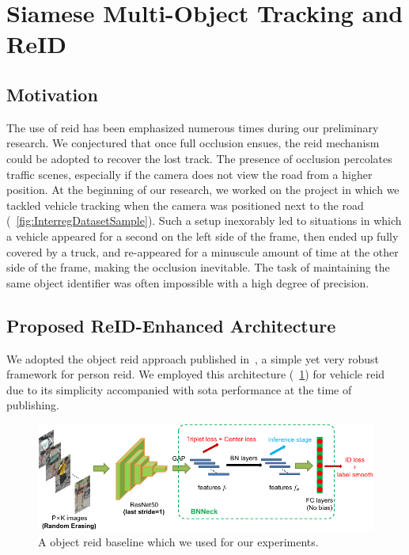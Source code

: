 \section{Siamese Multi-Object Tracking and ReID}
\label{sec:SiamMOTandReID}

\subsection{Motivation}

The use of \gls{reid} has been emphasized numerous times during our preliminary research. We conjectured that once full occlusion ensues, the \gls{reid} mechanism could be adopted to recover the lost track. The presence of occlusion percolates traffic scenes, especially if the camera does not view the road from a higher position. At the beginning of our research, we worked on the \interreg{} project in which we tackled vehicle tracking when the camera was positioned next to the road (\figtext{}~\ref{fig:InterregDatasetSample}). Such a setup inexorably led to situations in which a vehicle appeared for a second on the left side of the frame, then ended up fully covered by a truck, and re-appeared for a minuscule amount of time at the other side of the frame, making the occlusion inevitable. The task of maintaining the same object identifier was often impossible with a high degree of precision.

\subsection{Proposed ReID-Enhanced Architecture}
\label{ssec:ProposedReIDEnhancedArchitecture}

We adopted the object \gls{reid} approach published in~\cite{luo2019bagoftricksreid}, a simple yet very robust framework for person \gls{reid}. We employed this architecture (\figtext{}~\ref{fig:BagOfTricksReIDArchitecture}) for vehicle \gls{reid} due to its simplicity accompanied with \gls{sota} performance at the time of publishing.

\begin{figure}[!t]
    \centering
    \includegraphics[width=\linewidth]{figures/siamese_tracking/bagoftricks_reid_architecture.pdf}
    \caption[\gls{reid} baseline]{A object \gls{reid} baseline which we used for our experiments. }
    \label{fig:BagOfTricksReIDArchitecture}
\end{figure}

